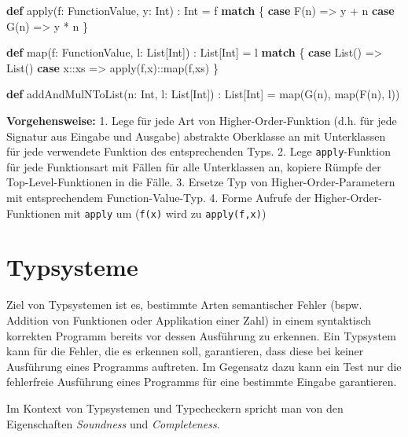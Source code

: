\documentclass[]{article}
\newenvironment{Shaded}{}{}
\newcommand{\FunctionTok}[1]{\textcolor[rgb]{0.02,0.16,0.49}{#1}}
\newcommand{\KeywordTok}[1]{\textcolor[rgb]{0.00,0.44,0.13}{\textbf{#1}}}
\newcommand{\NormalTok}[1]{#1}
\begin{document}
\begin{Shaded}
\begin{Highlighting}[]
\KeywordTok{def} \FunctionTok{apply}\NormalTok{(f: FunctionValue, y: Int) : Int = f }\KeywordTok{match}\NormalTok{ \{}
  \KeywordTok{case} \FunctionTok{F}\NormalTok{(n) =\textgreater{} y + n}
  \KeywordTok{case} \FunctionTok{G}\NormalTok{(n) =\textgreater{} y * n}
\NormalTok{\}}

\KeywordTok{def} \FunctionTok{map}\NormalTok{(f: FunctionValue, l: List[Int]) : List[Int] = l }\KeywordTok{match}\NormalTok{ \{}
  \KeywordTok{case}\NormalTok{ List() =\textgreater{} List()}
  \KeywordTok{case}\NormalTok{ x::xs =\textgreater{} }\FunctionTok{apply}\NormalTok{(f,x)::}\FunctionTok{map}\NormalTok{(f,xs)}
\NormalTok{\}}

\KeywordTok{def} \FunctionTok{addAndMulNToList}\NormalTok{(n: Int, l: List[Int]) : List[Int] =}
  \FunctionTok{map}\NormalTok{(}\FunctionTok{G}\NormalTok{(n), }\FunctionTok{map}\NormalTok{(}\FunctionTok{F}\NormalTok{(n), l))}
\end{Highlighting}
\end{Shaded}

\textbf{Vorgehensweise:} 1. Lege für jede Art von Higher-Order-Funktion
(d.h. für jede Signatur aus Eingabe und Ausgabe) abstrakte Oberklasse an
mit Unterklassen für jede verwendete Funktion des entsprechenden Typs.
2. Lege \texttt{apply}-Funktion für jede Funktionsart mit Fällen für
alle Unterklassen an, kopiere Rümpfe der Top-Level-Funktionen in die
Fälle. 3. Ersetze Typ von Higher-Order-Parametern mit entsprechendem
Function-Value-Typ. 4. Forme Aufrufe der Higher-Order-Funktionen mit
\texttt{apply} um (\texttt{f(x)} wird zu \texttt{apply(f,x)})

\hypertarget{typsysteme}{%
\section{Typsysteme}\label{typsysteme}}

Ziel von Typsystemen ist es, bestimmte Arten semantischer Fehler (bspw.
Addition von Funktionen oder Applikation einer Zahl) in einem
syntaktisch korrekten Programm bereits vor dessen Ausführung zu
erkennen. Ein Typsystem kann für die Fehler, die es erkennen soll,
garantieren, dass diese bei keiner Ausführung eines Programms auftreten.
Im Gegensatz dazu kann ein Test nur die fehlerfreie Ausführung eines
Programms für eine bestimmte Eingabe garantieren.

Im Kontext von Typsystemen und Typecheckern spricht man von den
Eigenschaften \emph{Soundness} und \emph{Completeness}.
\end{document}
